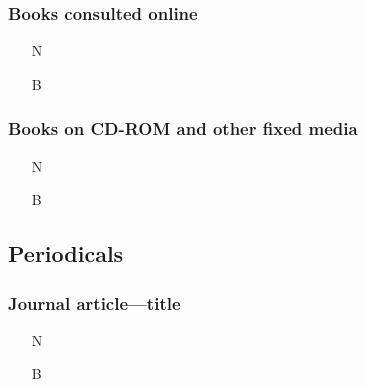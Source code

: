 \documentclass[11pt,letterpaper,oneside]{article}
\begin{document}
\subsubsection{Books consulted online}

\begin{itemize}
\item[N] 

\item[B] 
\end{itemize}

\subsubsection{Books on CD-ROM and other fixed media}

\begin{itemize}
\item[N] 

\item[B] 
\end{itemize}



\setcounter{subsection}{1}
\subsection{Periodicals}
\setcounter{subsection}{14}

\setcounter{subsubsection}{175}
\subsubsection{Journal article---title}

\begin{itemize}
\item[N] 

\item[B] 
\end{itemize}
\end{document}
